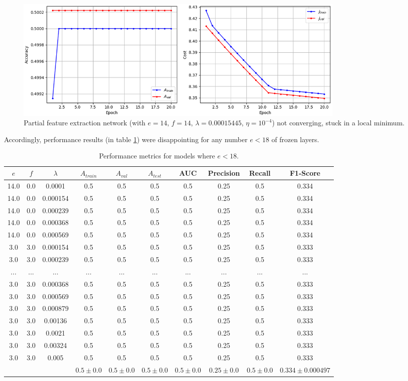 \begin{figure}[ht]
    \centering
    \includegraphics[width=0.8\textwidth]{figs/vgg16_partial_divergence.png}
    \caption{Partial feature extraction network (with $e = 14$, $f = 14$, $\lambda = 0.00015445$, $\eta = 10^{-4}$) not converging, stuck in a local minimum.}
    \label{fig:vgg16_partial_divergence}
\end{figure}

Accordingly, performance results (in table \ref{table:vgg16_partial}) were disappointing for any number $e < 18$ of frozen layers.

\begin{table}[ht]
\centering
\begin{tabular}{ |c|c|c|c|c|c|c|c|c|c| }
\hline
$e$ & $f$ & $\lambda$ & $A_{train}$ & $A_{val}$ & $A_{test}$ & AUC & Precision & Recall & F1-Score \\
\hline
14.0 & 0.0 & 0.0001 & 0.5 & 0.5 & 0.5 & 0.5 & 0.25 & 0.5 & 0.334 \\
14.0 & 0.0 & 0.000154 & 0.5 & 0.5 & 0.5 & 0.5 & 0.25 & 0.5 & 0.334 \\
14.0 & 0.0 & 0.000239 & 0.5 & 0.5 & 0.5 & 0.5 & 0.25 & 0.5 & 0.334 \\
14.0 & 0.0 & 0.000368 & 0.5 & 0.5 & 0.5 & 0.5 & 0.25 & 0.5 & 0.334 \\
14.0 & 0.0 & 0.000569 & 0.5 & 0.5 & 0.5 & 0.5 & 0.25 & 0.5 & 0.334 \\
3.0 & 3.0 & 0.000154 & 0.5 & 0.5 & 0.5 & 0.5 & 0.25 & 0.5 & 0.333 \\
3.0 & 3.0 & 0.000239 & 0.5 & 0.5 & 0.5 & 0.5 & 0.25 & 0.5 & 0.333 \\
... & ... & ... & ... & ... & ... & ... & ... & ... & ... \\
3.0 & 3.0 & 0.000368 & 0.5 & 0.5 & 0.5 & 0.5 & 0.25 & 0.5 & 0.333 \\
3.0 & 3.0 & 0.000569 & 0.5 & 0.5 & 0.5 & 0.5 & 0.25 & 0.5 & 0.333 \\
3.0 & 3.0 & 0.000879 & 0.5 & 0.5 & 0.5 & 0.5 & 0.25 & 0.5 & 0.333 \\
3.0 & 3.0 & 0.00136 & 0.5 & 0.5 & 0.5 & 0.5 & 0.25 & 0.5 & 0.333 \\
3.0 & 3.0 & 0.0021 & 0.5 & 0.5 & 0.5 & 0.5 & 0.25 & 0.5 & 0.333 \\
3.0 & 3.0 & 0.00324 & 0.5 & 0.5 & 0.5 & 0.5 & 0.25 & 0.5 & 0.333 \\
3.0 & 3.0 & 0.005 & 0.5 & 0.5 & 0.5 & 0.5 & 0.25 & 0.5 & 0.333 \\
\hline
 & & & $0.5\pm0.0$ & $0.5\pm0.0$ & $0.5\pm0.0$ & $0.5\pm0.0$ & $0.25\pm0.0$ & $0.5\pm0.0$ & $0.334\pm0.000497$ \\
\hline
\end{tabular}
\caption{Performance metrics for models where $e < 18$.}
\label{table:vgg16_partial}
\end{table}

